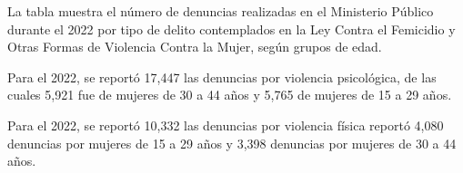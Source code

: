La tabla muestra el número de denuncias realizadas en el Ministerio Público durante el 2022 por tipo de delito contemplados en la Ley Contra el Femicidio y Otras Formas de Violencia Contra la Mujer, según grupos de edad.

Para el 2022,  se reportó 17,447 las denuncias por violencia psicológica, de las cuales 5,921 fue de mujeres de 30 a 44 años y 5,765 de mujeres de 15 a 29 años. 

Para el 2022,  se reportó 10,332 las denuncias por violencia física reportó 4,080 denuncias por mujeres de 15 a 29 años y 3,398 denuncias por mujeres de 30 a 44 años. 